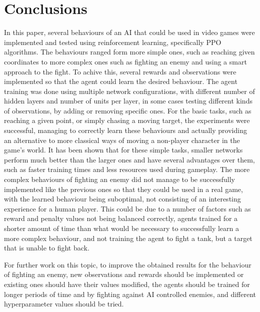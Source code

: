 \chapter{Conclusions}



In this paper, several behaviours of an AI that could be used in video games were implemented and tested using reinforcement learning, specifically PPO algorithms. The behaviours ranged form more simple ones, such as reaching given coordinates to more complex ones such as fighting an enemy and using a smart approach to the fight. To achive this, several rewards and observations were implemented so that the agent could learn the desired behaviour. The agent training was done using multiple network configurations, with different number of hidden layers and number of units per layer, in some cases testing different kinds of observations, by adding or removing specific ones. For the basic tasks, such as reaching a given point, or simply chasing a moving target, the experiments were successful, managing to correctly learn these behaviours and actually providing an alternative to more classical ways of moving a non-player character in the game's world. It has been shown that for these simple tasks, smaller networks perform much better than the larger ones and have several advantages over them, such as faster training times and less resources used during gameplay. The more complex behaviours of fighting an enemy did not manage to be successfully implemented like the previous ones so that they could be used in a real game, with the learned behaviour being suboptimal, not consisting of an interesting experience for a human player. This could be due to a number of factors such as reward and penalty values not being balanced correctly, agents trained for a shorter amount of time than what would be necessary to successfully learn a more complex behaviour, and not training the agent to fight a tank, but a target that is unable to fight back.

For further work on this topic, to improve the obtained results for the behaviour of fighting an enemy, new observations and rewards should be implemented or existing ones should have their values modified, the agents should be trained for longer periods of time and by fighting against AI controlled enemies, and different hyperparameter values should be tried.